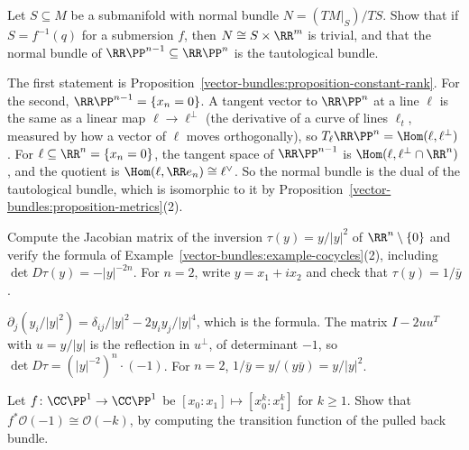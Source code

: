 \begin{exercise}\label{vector-bundles:exercise-normal-bundle}
Let $S \subseteq M$ be a submanifold with normal bundle $N = (TM|_S)/TS$. Show that if $S = f^{-1}(q)$ for a submersion $f$, then $N \cong S \times \RR^m$ is trivial, and that the normal bundle of
$\RR\PP^{n-1} \subseteq \RR\PP^n$ is the tautological bundle.
\end{exercise}

\begin{solution}
The first statement is Proposition~\ref{vector-bundles:proposition-constant-rank}. For the second, $\RR\PP^{n-1} = \{x_n = 0\}$. A tangent vector to $\RR\PP^n$ at a line $\ell$ is the same as a
linear map $\ell \to \ell^\perp$ (the derivative of a curve of lines $\ell_t$, measured by how a vector of $\ell$ moves orthogonally), so $T_\ell\RR\PP^n = \Hom(\ell, \ell^\perp)$. For
$\ell \subseteq \RR^n = \{x_n = 0\}$, the tangent space of $\RR\PP^{n-1}$ is $\Hom(\ell, \ell^\perp \cap \RR^n)$, and the quotient is $\Hom(\ell, \RR e_n) \cong \ell^\vee$. So the normal bundle is the
dual of the tautological bundle, which is isomorphic to it by Proposition~\ref{vector-bundles:proposition-metrics}(2).
\end{solution}

\begin{exercise}\label{vector-bundles:exercise-inversion-jacobian}
Compute the Jacobian matrix of the inversion $\tau(y) = y/|y|^2$ of $\RR^n \setminus \{0\}$ and verify the formula of Example~\ref{vector-bundles:example-cocycles}(2), including
$\det D\tau(y) = -|y|^{-2n}$. For $n = 2$, write $y = x_1 + ix_2$ and check that $\tau(y) = 1/\bar y$.
\end{exercise}

\begin{solution}
$\partial_j(y_i/|y|^2) = \delta_{ij}/|y|^2 - 2y_iy_j/|y|^4$, which is the formula. The matrix $I - 2uu^T$ with $u = y/|y|$ is the reflection in $u^\perp$, of determinant $-1$, so
$\det D\tau = (|y|^{-2})^n \cdot (-1)$. For $n = 2$, $1/\bar y = y/(y\bar y) = y/|y|^2$.
\end{solution}

\begin{exercise}\label{vector-bundles:exercise-pullback-degree}
Let $f \colon \CC\PP^1 \to \CC\PP^1$ be $[x_0 : x_1] \mapsto [x_0^k : x_1^k]$ for $k \geq 1$. Show that $f^*\mathcal{O}(-1) \cong \mathcal{O}(-k)$, by computing the transition function of the
pulled back bundle.
\end{exercise}

